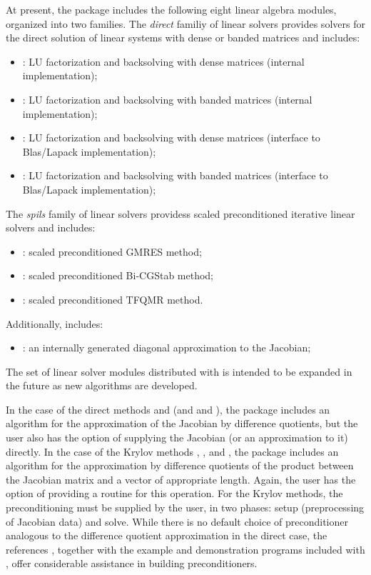 At present, the package includes the following eight {\cvode} linear algebra
modules, organized into two families. The {\em direct} familiy of linear
solvers provides solvers for the direct solution of linear systems with
dense or banded matrices and includes:
\begin{itemize} 
\item {\cvdense}: LU factorization and backsolving with dense matrices (internal implementation); 
\item {\cvband}: LU factorization and backsolving with banded matrices (internal implementation); 
\item {\cvlapdense}: LU factorization and backsolving with dense matrices (interface to Blas/Lapack implementation); 
\item {\cvlapband}: LU factorization and backsolving with banded matrices (interface to Blas/Lapack implementation); 
\end{itemize}
The {\em spils} family of linear solvers providess scaled preconditioned
iterative linear solvers and includes:
\begin{itemize} 
\item {\cvspgmr}: scaled preconditioned GMRES method;
\item {\cvspbcg}: scaled preconditioned Bi-CGStab method;
\item {\cvsptfqmr}: scaled preconditioned TFQMR method.
\end{itemize}
Additionally, {\cvode} includes:
\begin{itemize}
\item {\cvdiag}: an internally generated diagonal approximation to the 
  Jacobian; 
\end{itemize}
The set of linear solver modules distributed with {\cvode} is intended to be expanded in the
future as new algorithms are developed.

In the case of the direct methods {\cvdense} and {\cvband} (and {\cvlapdense} and {\cvlapband}),
the package includes an algorithm for the approximation of the Jacobian by difference
quotients, but the user also has the option of supplying the Jacobian
(or an approximation to it) directly. In the case of the Krylov methods
{\cvspgmr}, {\cvspbcg}, and {\cvsptfqmr}, the package includes an algorithm for
the approximation by difference quotients of the product between the Jacobian
matrix and a vector of appropriate length. Again, the user has the option of
providing a routine for this operation.
For the Krylov methods, 
the preconditioning must be supplied by the user, in two phases: 
setup (preprocessing of Jacobian data) and solve.
While there is no default
choice of preconditioner analogous to the difference quotient
approximation in the direct case, the references
\cite{BrHi:89,Byr:92}, together with
the example and demonstration programs included with {\cvode}, offer
considerable assistance in building preconditioners.

